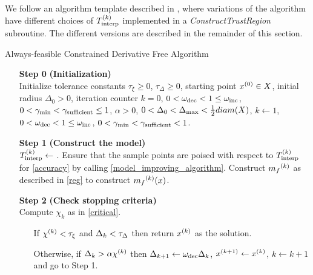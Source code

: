 We follow an algorithm template described in \cite{doi:10.1080/10556788.2015.1026968}, where variations of the algorithm have different choices of $ {T_{\text{interp}}^{(k)}} $ implemented in a \emph{ConstructTrustRegion} subroutine.
The different versions are described in the remainder of this section.



\begin{algorithm}[H]
    \caption{Always-feasible Constrained Derivative Free Algorithm}
    \label{constrained_dfo}
    \begin{itemize}
        \item[\textbf{Step 0}] \textbf{(Initialization)} \\
            Initialize tolerance constants 
            $\tau_{\xi} \ge 0$,
            $\tau_{\Delta} \ge 0$,
            starting point $x^{(0)} \in X$,
            initial radius $\Delta_0 > 0$,
            iteration counter $k=0$,
            $0 < \omega_{\text{dec}} < 1 \le \omega_{\text{inc}}$,
            $0 < \gamma_{\text{min}} < \gamma_{\text{sufficient}} \le 1$,
            $\alpha > 0$,
            $0 < \Delta_0 < \Delta_{\text{max}} < \frac 1 2 diam(X)$,
            $k \gets 1$,
            $0 < \omega_{\text{dec}} < 1 \le \omega_{\text{inc}}$,
            $0 < \gamma_{\text{min}} < \gamma_{\text{sufficient}} < 1$.
            
        \item[\textbf{Step 1}] \textbf{(Construct the model)} \\
            $ {T_{\text{interp}}^{(k)}} \gets $ .
            Ensure that the sample points are poised with respect to $ {T_{\text{interp}}^{(k)}} $ for \cref{accuracy} by calling \cref{model_improving_algorithm}.
            Construct ${{m}_f}^{(k)}$ as described in \cref{reg} to construct ${{m}_f}^{(k)}(x)$.
        
        \item[\textbf{Step 2}] \textbf{(Check stopping criteria)} \\
            Compute $\chi_k$ as in \cref{critical}. \begin{itemize}
                \item[] If $ {\chi^{(k)}} < \tau_{\xi} $ and $\Delta_k <\tau_{\Delta}$ then return ${x}^{(k)}$ as the solution.
                \item[] Otherwise, if $\Delta_k > \alpha {\chi^{(k)}}$ then 
                $\Delta_{k+1} \gets \omega_{\text{dec}}\Delta_{k}$, 
                $x^{(k+1)} \gets {x}^{(k)}$,
                $k \gets k+1$ and go to Step 1.
            \end{itemize}
        

\end{itemize}
\end{algorithm}
